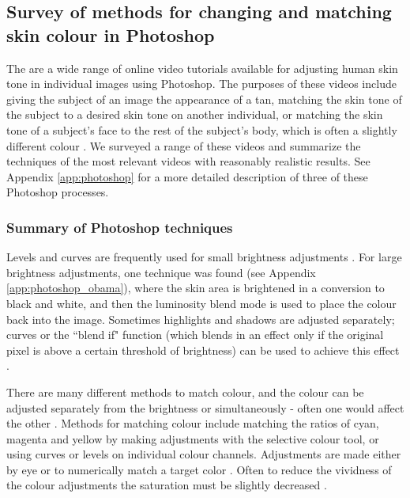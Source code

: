 \subsection{Survey of methods for changing and matching skin colour in Photoshop}

The are a wide range of online video tutorials available for adjusting human skin tone in individual images using Photoshop. The purposes of these videos include giving the subject of an image the appearance of a tan, matching the skin tone of the subject to a desired skin tone on another individual, or matching the skin tone of a subject's face to the rest of the subject's body, which is often a slightly different colour \cite{photoshop:tan} \cite{photoshop:match_other} \cite{photoshop:match_body}. We surveyed a range of these videos and summarize the techniques of the most relevant videos with reasonably realistic results. See Appendix \ref{app:photoshop} for a more detailed description of three of these Photoshop processes. 

\subsubsection*{Summary of Photoshop techniques}

Levels and curves are frequently used for small brightness adjustments \cite{photoshop:obama} \cite{photoshop:match_body} \cite{photoshop:match_other}. For large brightness adjustments, one technique was found (see Appendix \ref{app:photoshop_obama}), where the skin area is brightened in a conversion to black and white, and then the luminosity blend mode is used to place the colour back into the image. Sometimes highlights and shadows are adjusted separately; curves or the ``blend if" function (which blends in an effect only if the original pixel is above a certain threshold of brightness) can be used to achieve this effect \cite{photoshop:tan}.

There are many different methods to match colour, and the colour can be adjusted separately from the brightness or simultaneously - often one would affect the other \cite{photoshop:match_body} \cite{photoshop:match_other}. Methods for matching colour include matching the ratios of cyan, magenta and yellow by making adjustments with the selective colour tool, or using curves or levels on individual colour channels. Adjustments are made either by eye or to numerically match a target color \cite{photoshop:selective} \cite{photoshop:match_body} \cite{photoshop:match_other}. Often to reduce the vividness of the colour adjustments the saturation must be slightly decreased \cite{photoshop:obama} \cite{photoshop:match_body}.

